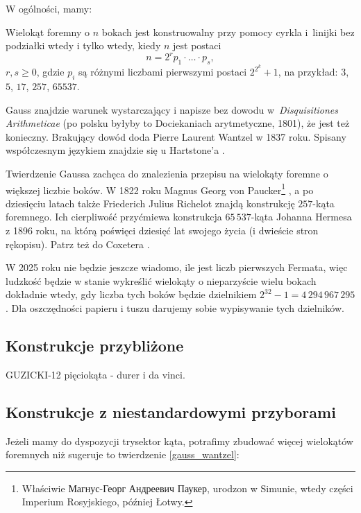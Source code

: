 W ogólności, mamy:
\begin{theorem}
    \label{gauss_wantzel}
    Wielokąt foremny o $n$ bokach jest konstruowalny przy pomocy cyrkla i~linijki bez podziałki wtedy i tylko wtedy, kiedy $n$ jest postaci
    \begin{equation}
        n = 2^r p_1 \cdot \ldots \cdot p_s,
    \end{equation}
    $r, s \ge 0$, gdzie $p_i$ są różnymi liczbami pierwszymi postaci $2^{2^k} + 1$, na przykład: $3$, $5$, $17$, $257$, $65537$.
\end{theorem}

Gauss znajdzie warunek wystarczający i napisze bez dowodu w~\emph{Disquisitiones Arithmeticae} (po polsku byłyby to Dociekaniach arytmetyczne, 1801), że jest też konieczny.
Brakujący dowód doda Pierre Laurent Wantzel w 1837 roku.
%
Spisany współczesnym językiem znajdzie się u Hartstone'a \cite[s. 258]{hartshorne2000}.

Twierdzenie Gaussa zachęca do znalezienia przepisu na wielokąty foremne o większej liczbie boków.
W 1822 roku Magnus Georg von Paucker\footnote{Właściwie Магнус-Георг Андреевич Паукер, urodzon w Simunie, wtedy części Imperium Rosyjskiego, później Łotwy.} \cite{paucker_1822}, a po dziesięciu latach także Friederich Julius Richelot \cite{richelot_1832} znajdą konstrukcję $257$-kąta foremnego. 
%
%
Ich cierpliwość przyćmiewa konstrukcja $65\,537$-kąta Johanna Hermesa z 1896 roku, na którą poświęci dziesięć lat swojego życia (i dwieście stron rękopisu).
%
Patrz też do Coxetera \cite[s. 42, 43]{coxeter_1967}.

W 2025 roku nie będzie jeszcze wiadomo, ile jest liczb pierwszych Fermata, więc ludzkość będzie w stanie wykreślić wielokąty o nieparzyście wielu bokach dokładnie wtedy, gdy liczba tych boków będzie dzielnikiem $2^{32} - 1 = 4\,294\,967\,295$.
Dla oszczędności papieru i tuszu darujemy sobie wypisywanie tych dzielników.


\subsection{Konstrukcje przybliżone}
GUZICKI-12 pięciokąta - durer i da vinci.

\subsection{Konstrukcje z niestandardowymi przyborami}
Jeżeli mamy do dyspozycji trysektor kąta, potrafimy zbudować więcej wielokątów foremnych niż sugeruje to twierdzenie \ref{gauss_wantzel}:


